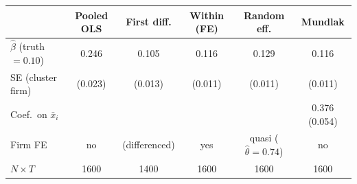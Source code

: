 \begin{tabular}{lccccc}\toprule
 & Pooled OLS & First diff. & Within (FE) & Random eff. & Mundlak \\ \midrule
$\widehat\beta$ (truth $= 0.10$) & 0.246 & 0.105 & 0.116 & 0.129 & 0.116 \\
SE (cluster firm) & (0.023) & (0.013) & (0.011) & (0.011) & (0.011) \\
Coef.\ on $\bar x_i$ & & & & & 0.376 (0.054) \\
Firm FE & no & (differenced) & yes & quasi ($\hat\theta=0.74$) & no \\
$N \times T$ & 1600 & 1400 & 1600 & 1600 & 1600 \\
\bottomrule\end{tabular}
